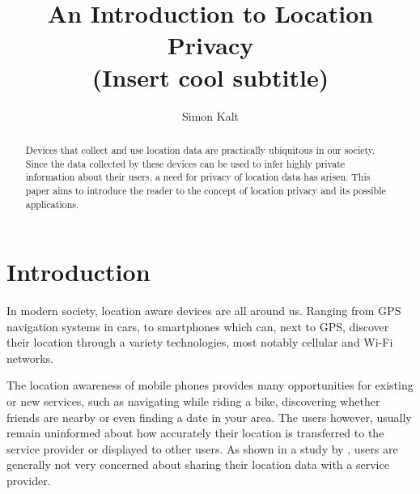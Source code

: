 \documentclass[twocolumn, a4paper, 10pt]{article}
\begin{document}
\title{
    {\Large An Introduction to Location Privacy \\}
    {\large (Insert cool subtitle)}
}

\author{
    Simon Kalt
}

\maketitle

\def\abstractname{Abstract}
\begin{abstract}
{
Devices that collect and use location data are practically ubiquitous in our society. Since the data collected by these devices can be used to infer highly private information about their users, a need for privacy of location data has arisen. This paper aims to introduce the reader to the concept of location privacy and its possible applications.
}
\end{abstract}


\section{Introduction}
\label{sec:introduction}
In modern society, location aware devices are all around us. Ranging from GPS navigation systems in cars, to smartphones which can, next to GPS, discover their location through a variety technologies, most notably cellular and Wi-Fi networks.

The location awareness of mobile phones provides many opportunities for existing or new services, such as navigating while riding a bike, discovering whether friends are nearby or even finding a date in your area. The users however, usually remain uninformed about how accurately their location is transferred to the service provider or displayed to other users. As shown in a study by \cite{danezis2005much}, users are generally not very concerned about sharing their location data with a service provider.

\lipsum[1-3]


{
    
    
}

\appendix
\end{document}
